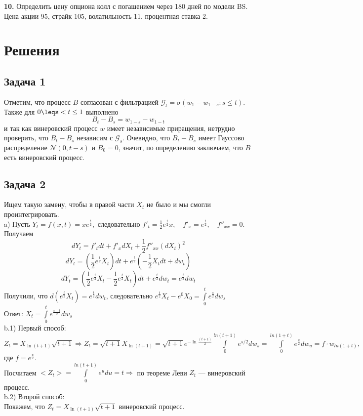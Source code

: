 \documentclass[12pt]{article}
\newcommand\cG{{\mathcal G}}
\newcommand\cN{{\mathcal N}}
\begin{document}
\medskip
\noindent
{\bf 10.} Определить цену опциона колл  с погашением через 180 дней по модели BS.  Цена
акции 95, страйк 105, волатильность 11, процентная ставка  2. 

\section{Решения}
\subsection{Задача 1}
Отметим, что процесс $B$ согласован с фильтрацией $\cG_t = \sigma(w_1-w_{1-s} : s \leq t)$. Также для $0\leqs < t \leq 1$ выполнено
\[B_t-B_s = w_{1-s}-w_{1-t} \]
и так как винеровский процесс $w$ имеет независимые приращения, нетрудно проверить, что $B_t-B_s$ независим с $\cG_s$. Очевидно, что $B_t-B_s$ имеет Гауссово распределение $\cN(0, t-s)$ и $B_0 = 0$, значит, по определению заключаем, что $B$ есть винеровский процесс.
\subsection{Задача 2}
Ищем такую замену, чтобы в правой части $X_t$ не было и мы смогли проинтегрировать.\\
a) Пусть $Y_t=f(x,t)=x e^{\frac{t}{2}},$ следовательно $f'_t=\frac{1}{2}e^{\frac{t}{2}}x, \quad f'_x=e^{\frac{t}{2}},\quad f''_{xx}=0.$\\
Получаем
$$dY_t=f'_tdt+f'_xdX_t+\frac{1}{2}f''_{xx}(dX_t)^2$$
$$dY_t=(\frac{1}{2}e^{\frac{t}{2}}X_t)dt + e^{\frac{t}{2}}(-\frac{1}{2}X_tdt+dw_t)$$
$$dY_t=(\frac{1}{2}e^{\frac{t}{2}}X_t-\frac{1}{2}e^{\frac{t}{2}}X_t)dt+e^{\frac{t}{2}}dw_t=e^{\frac{t}{2}}dw_t$$
Получили, что $d(e^{\frac{t}{2}}X_t)=e^{\frac{t}{2}}dw_t$, следовательно $e^{\frac{t}{2}}X_t-e^0X_0=\int\limits_0^te^{\frac{s}{2}} dw_s$\\
Ответ: $X_t=\int\limits_0^te^{\frac{s-t}{2}} dw_s$\\
b.1) Первый способ:\\
$Z_t=X_{\ln{(t+1)}}\sqrt{t+1}\Rightarrow Z_t=\sqrt{t+1}X_{\ln{(t+1)}}=\sqrt{t+1}e^{-\ln{\frac{(t+1)}{2}}}\int\limits_0^{ln{(t+1)}}e^{s/2}d w_s = \int\limits_0^{ln{(1+t)}}e^\frac{u}{2}dw_u=f\cdot w_{ln(1+t)},$ где $f=e^{\frac{u}{2}}.$\\
Посчитаем $<Z_t>=\int\limits_0^{ln{(t+1)}}e^udu=t\Rightarrow$ по теореме Леви $Z_t$ — винеровский процесс.\\

b.2) Второй способ:\\
Покажем, что $Z_t=X_{\ln(t+1)}\sqrt{t+1}$ винеровский процесс.\\
\end{document}
